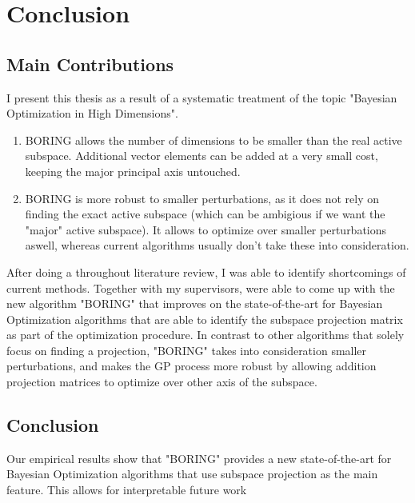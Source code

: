 \chapter{Conclusion}

\ifpdf
    \graphicspath{{Chapter7/Figs/Raster/}{Chapter7/Figs/PDF/}{Chapter7/Figs/}}
\else
    \graphicspath{{Chapter7/Figs/Vector/}{Chapter7/Figs/}}
\fi

\section{Main Contributions}
I present this thesis as a result of a systematic treatment of the topic "Bayesian Optimization in High Dimensions".

\begin{enumerate}
\item BORING allows the number of dimensions to be smaller than the real active subspace.
Additional vector elements can be added at a very small cost, keeping the major principal axis untouched.
\item BORING is more robust to smaller perturbations, as it does not rely on finding the exact active subspace (which can be ambigious if we want the "major" active subspace).
It allows to optimize over smaller perturbations aswell, whereas current algorithms usually don't take these into consideration.
\end{enumerate}

After doing a throughout literature review, I was able to identify shortcomings of current methods.
Together with my supervisors, were able to come up with the new algorithm "BORING" that improves on the state-of-the-art for Bayesian Optimization algorithms that are able to identify the subspace projection matrix as part of the optimization procedure.
In contrast to other algorithms that solely focus on finding a projection, "BORING" takes into consideration smaller perturbations, and makes the GP process more robust by allowing addition projection matrices to optimize over other axis of the subspace. \\

\section{Conclusion}

Our empirical results show that "BORING" provides a new state-of-the-art for Bayesian Optimization algorithms that use subspace projection as the main feature.
This allows for interpretable future work
 



